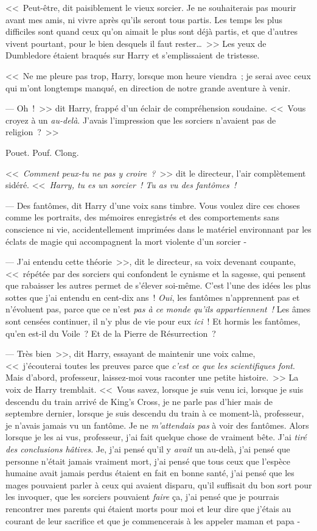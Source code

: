<<~Peut-être, dit paisiblement le vieux sorcier. Je ne souhaiterais pas mourir avant mes amis, ni vivre après qu'ils seront tous partis. Les temps les plus difficiles sont quand ceux qu'on aimait le plus sont déjà partis, et que d'autres vivent pourtant, pour le bien desquels il faut rester…~>> Les yeux de Dumbledore étaient braqués sur Harry et s'emplissaient de tristesse.

<<~Ne me pleure pas trop, Harry, lorsque mon heure viendra~; je serai avec ceux qui m'ont longtemps manqué, en direction de notre grande aventure à venir.

--- Oh~!~>> dit Harry, frappé d'un éclair de compréhension soudaine. <<~Vous croyez à un \emph{au-delà}. J'avais l'impression que les sorciers n'avaient pas de religion~?~>>

\later

Pouet. Pouf. Clong.

<<~\emph{Comment peux-tu ne pas y croire~?}~>> dit le directeur, l'air complètement sidéré. <<~\emph{Harry, tu es un sorcier~! Tu as vu des fantômes~!}

--- Des fantômes, dit Harry d'une voix sans timbre. Vous voulez dire ces choses comme les portraits, des mémoires enregistrés et des comportements sans conscience ni vie, accidentellement imprimées dans le matériel environnant par les éclats de magie qui accompagnent la mort violente d'un sorcier -

--- J'ai entendu cette théorie~>>, dit le directeur, sa voix devenant coupante, <<~répétée par des sorciers qui confondent le cynisme et la sagesse, qui pensent que rabaisser les autres permet de s'élever soi-même. C'est l'une des idées les plus sottes que j'ai entendu en cent-dix ans~! \emph{Oui}, les fantômes n'apprennent pas et n'évoluent pas, parce que ce n'est \emph{pas à ce monde qu'ils appartiennent~!} Les âmes sont censées continuer, il n'y plus de vie pour eux \emph{ici}~! Et hormis les fantômes, qu'en est-il du Voile~? Et de la Pierre de Résurrection~?

--- Très bien~>>, dit Harry, essayant de maintenir une voix calme, <<~j'écouterai toutes les preuves parce que \emph{c'est ce que les scientifiques font}. Mais d'abord, professeur, laissez-moi vous raconter une petite histoire.~>> La voix de Harry tremblait. <<~Vous savez, lorsque je suis venu ici, lorsque je suis descendu du train arrivé de King's Cross, je ne parle pas d'hier mais de septembre dernier, lorsque je suis descendu du train à ce moment-là, professeur, je n'avais jamais vu un fantôme. Je ne \emph{m'attendais pas} à voir des fantômes. Alors lorsque je les ai vus, professeur, j'ai fait quelque chose de vraiment bête. J'ai \emph{tiré des conclusions hâtives}. Je, j'ai pensé qu'il y \emph{avait} un au-delà, j'ai pensé que personne n'était jamais vraiment mort, j'ai pensé que tous ceux que l'espèce humaine avait jamais perdus étaient en fait en bonne santé, j'ai pensé que les mages pouvaient parler à ceux qui avaient disparu, qu'il suffisait du bon sort pour les invoquer, que les sorciers pouvaient \emph{faire} ça, j'ai pensé que je pourrais rencontrer mes parents qui étaient morts pour moi et leur dire que j'étais au courant de leur sacrifice et que je commencerais à les appeler maman et papa -

